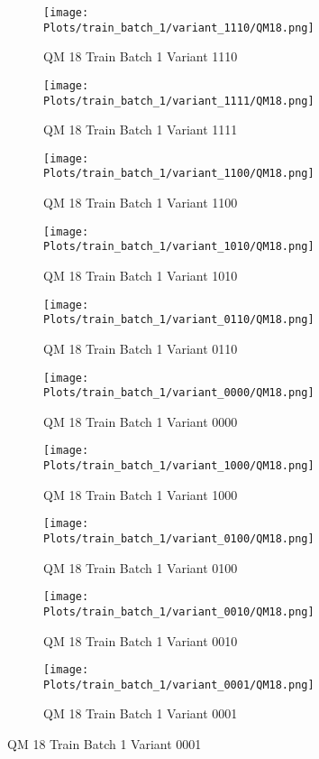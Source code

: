 \documentclass{DissertateFigs}
\begin{document}
\begin{figure}[t!]
    \begin{subfigure}{0.47\textwidth}
    \texttt{[image: Plots/train\_batch\_1/variant\_1110/QM18.png]}
    \caption{QM 18 Train Batch 1 Variant 1110}
    \end{subfigure}
    \begin{subfigure}{0.47\textwidth}
    \texttt{[image: Plots/train\_batch\_1/variant\_1111/QM18.png]}
    \caption{QM 18 Train Batch 1 Variant 1111}
    \end{subfigure}

\medskip

    \begin{subfigure}{0.47\textwidth}
    \texttt{[image: Plots/train\_batch\_1/variant\_1100/QM18.png]}
    \caption{QM 18 Train Batch 1 Variant 1100}
    \end{subfigure}
    \begin{subfigure}{0.47\textwidth}
    \texttt{[image: Plots/train\_batch\_1/variant\_1010/QM18.png]}
    \caption{QM 18 Train Batch 1 Variant 1010}
    \end{subfigure}

\medskip

    \begin{subfigure}{0.47\textwidth}
    \texttt{[image: Plots/train\_batch\_1/variant\_0110/QM18.png]}
    \caption{QM 18 Train Batch 1 Variant 0110}
    \end{subfigure}
    \begin{subfigure}{0.47\textwidth}
    \texttt{[image: Plots/train\_batch\_1/variant\_0000/QM18.png]}
    \caption{QM 18 Train Batch 1 Variant 0000}
    \end{subfigure}

\medskip

    \begin{subfigure}{0.47\textwidth}
    \texttt{[image: Plots/train\_batch\_1/variant\_1000/QM18.png]}
    \caption{QM 18 Train Batch 1 Variant 1000}
    \end{subfigure}
    \begin{subfigure}{0.47\textwidth}
    \texttt{[image: Plots/train\_batch\_1/variant\_0100/QM18.png]}
    \caption{QM 18 Train Batch 1 Variant 0100}
    \end{subfigure}

\medskip

    \begin{subfigure}{0.47\textwidth}
    \texttt{[image: Plots/train\_batch\_1/variant\_0010/QM18.png]}
    \caption{QM 18 Train Batch 1 Variant 0010}
    \end{subfigure}
    \begin{subfigure}{0.47\textwidth}
    \texttt{[image: Plots/train\_batch\_1/variant\_0001/QM18.png]}
    \caption{QM 18 Train Batch 1 Variant 0001}
    \end{subfigure}


\end{figure}
\end{document}
